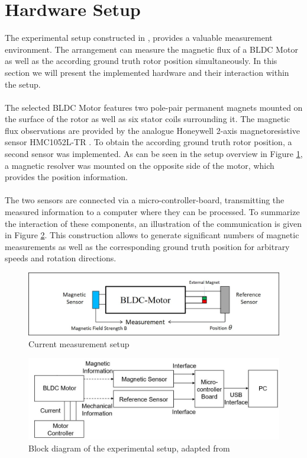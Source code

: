 \documentclass[english]{isasthesis}
\begin{document}
    	\section{Hardware Setup}\label{hardware}
    	The experimental setup constructed in \cite{fabian}, provides a valuable measurement environment. The arrangement can measure the magnetic flux of a BLDC Motor as well as the according ground truth rotor position simultaneously. In this section we will present the implemented hardware and their interaction within the setup. \\ \\
		The selected BLDC Motor features two pole-pair permanent magnets mounted on the surface of the rotor as well as six stator coils surrounding it. The magnetic flux observations are provided by the analogue Honeywell 2-axis magnetoresistive sensor HMC1052L-TR \cite{honeywell}. To obtain the according ground truth rotor position, a second sensor was implemented. As can be seen in the setup overview in Figure \ref{fig:measurement set-up}, a magnetic resolver was mounted on the opposite side of the motor, which provides the position information. \\\\
	The two sensors are connected via a micro-controller-board, transmitting the measured information to a computer where they can be processed. To summarize the interaction of these components, an illustration of the communication is given in Figure \ref{fig:hardware set-up}. This construction allows to generate significant numbers of magnetic measurements as well as the corresponding ground truth position for arbitrary speeds and rotation directions. \\
	\begin{figure}[t]
                \centering
                \includegraphics[width=1\textwidth]{figures/hardware-setup.jpg}
                \caption{Current measurement setup}
                \label{fig:measurement set-up}
     \end{figure}
     \begin{figure}[t]
                \centering
                \includegraphics[width=1\textwidth]{figures/HardwareBlock3.jpg}
                \caption{Block diagram of the experimental setup, adapted from \cite{fabian}}
                \label{fig:hardware set-up}
     \end{figure}
      
\end{document}
